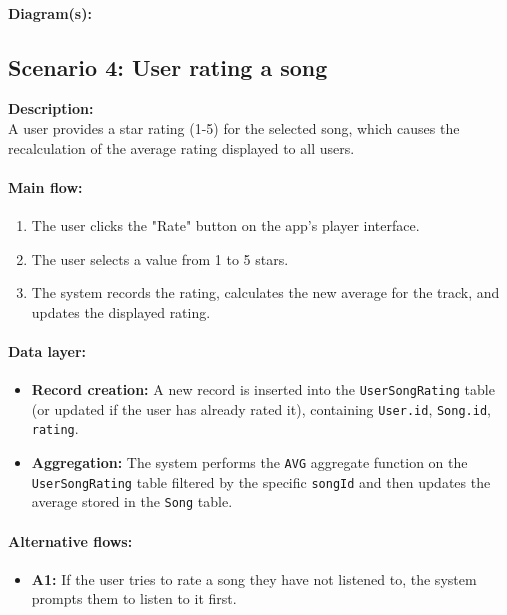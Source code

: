 \documentclass[11pt, a4paper]{article}
\begin{document}
\paragraph{Diagram(s):}

\subsection{Scenario 4: User rating a song}

\textbf{Description:}\\
A user provides a star rating (1-5) for the selected song, which causes the recalculation of the average rating displayed to all users.

\paragraph{Main flow:}
\begin{enumerate}
    \item The user clicks the "Rate" button on the app's player interface.
    \item The user selects a value from 1 to 5 stars.
    \item The system records the rating, calculates the new average for the track, and updates the displayed rating.
\end{enumerate}

\paragraph{Data layer:}
\begin{itemize}
    \item \textbf{Record creation:} A new record is inserted into the \texttt{UserSongRating} table (or updated if the user has already rated it), containing \texttt{User.id}, \texttt{Song.id}, \texttt{rating}.
    \item \textbf{Aggregation:} The system performs the \texttt{AVG} aggregate function on the \texttt{UserSongRating} table filtered by the specific \texttt{songId} and then updates the average stored in the \texttt{Song} table.
\end{itemize}

\paragraph{Alternative flows:}
\begin{itemize}
    \item \textbf{A1:} If the user tries to rate a song they have not listened to, the system prompts them to listen to it first.
\end{itemize}
\end{document}
